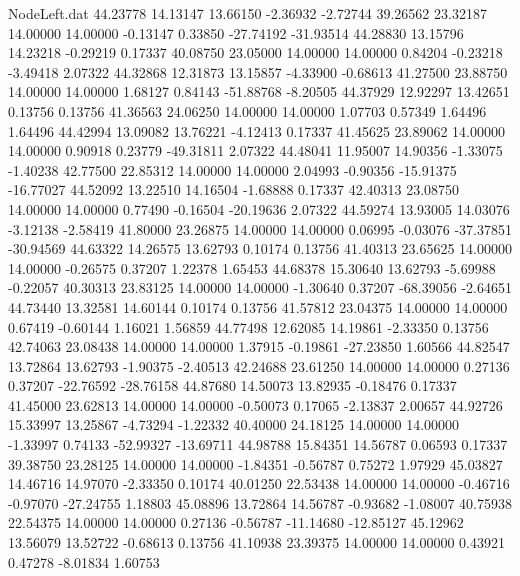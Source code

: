 \begin{filecontents}{NodeLeft.dat}
  44.23778   14.13147   13.66150    -2.36932   -2.72744   39.26562   23.32187   14.00000   14.00000   -0.13147    0.33850  -27.74192  -31.93514
  44.28830   13.15796   14.23218    -0.29219    0.17337   40.08750   23.05000   14.00000   14.00000    0.84204   -0.23218   -3.49418    2.07322
  44.32868   12.31873   13.15857    -4.33900   -0.68613   41.27500   23.88750   14.00000   14.00000    1.68127    0.84143  -51.88768   -8.20505
  44.37929   12.92297   13.42651     0.13756    0.13756   41.36563   24.06250   14.00000   14.00000    1.07703    0.57349    1.64496    1.64496
  44.42994   13.09082   13.76221    -4.12413    0.17337   41.45625   23.89062   14.00000   14.00000    0.90918    0.23779  -49.31811    2.07322
  44.48041   11.95007   14.90356    -1.33075   -1.40238   42.77500   22.85312   14.00000   14.00000    2.04993   -0.90356  -15.91375  -16.77027
  44.52092   13.22510   14.16504    -1.68888    0.17337   42.40313   23.08750   14.00000   14.00000    0.77490   -0.16504  -20.19636    2.07322
  44.59274   13.93005   14.03076    -3.12138   -2.58419   41.80000   23.26875   14.00000   14.00000    0.06995   -0.03076  -37.37851  -30.94569
  44.63322   14.26575   13.62793     0.10174    0.13756   41.40313   23.65625   14.00000   14.00000   -0.26575    0.37207    1.22378    1.65453
  44.68378   15.30640   13.62793    -5.69988   -0.22057   40.30313   23.83125   14.00000   14.00000   -1.30640    0.37207  -68.39056   -2.64651
  44.73440   13.32581   14.60144     0.10174    0.13756   41.57812   23.04375   14.00000   14.00000    0.67419   -0.60144    1.16021    1.56859
  44.77498   12.62085   14.19861    -2.33350    0.13756   42.74063   23.08438   14.00000   14.00000    1.37915   -0.19861  -27.23850    1.60566
  44.82547   13.72864   13.62793    -1.90375   -2.40513   42.24688   23.61250   14.00000   14.00000    0.27136    0.37207  -22.76592  -28.76158
  44.87680   14.50073   13.82935    -0.18476    0.17337   41.45000   23.62813   14.00000   14.00000   -0.50073    0.17065   -2.13837    2.00657
  44.92726   15.33997   13.25867    -4.73294   -1.22332   40.40000   24.18125   14.00000   14.00000   -1.33997    0.74133  -52.99327  -13.69711
  44.98788   15.84351   14.56787     0.06593    0.17337   39.38750   23.28125   14.00000   14.00000   -1.84351   -0.56787    0.75272    1.97929
  45.03827   14.46716   14.97070    -2.33350    0.10174   40.01250   22.53438   14.00000   14.00000   -0.46716   -0.97070  -27.24755    1.18803
  45.08896   13.72864   14.56787    -0.93682   -1.08007   40.75938   22.54375   14.00000   14.00000    0.27136   -0.56787  -11.14680  -12.85127
  45.12962   13.56079   13.52722    -0.68613    0.13756   41.10938   23.39375   14.00000   14.00000    0.43921    0.47278   -8.01834    1.60753

\end{filecontents}
